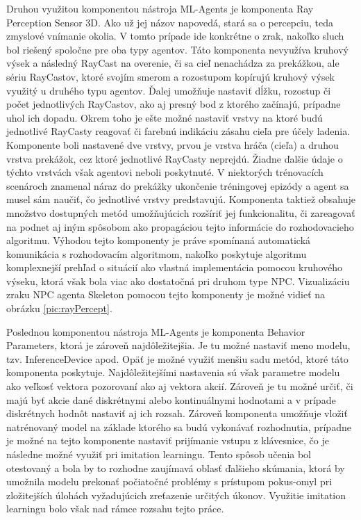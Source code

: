\documentclass[slovak, master]{diploma}
\begin{document}
Druhou využitou komponentou nástroja ML-Agents je komponenta Ray Perception Sensor 3D. Ako už jej názov napovedá, stará sa o percepciu, teda zmyslové vnímanie okolia. V tomto prípade ide konkrétne o zrak, nakoľko sluch bol riešený spoločne pre oba typy agentov. Táto komponenta nevyužíva kruhový výsek a následný RayCast na overenie, či sa cieľ nenachádza za prekážkou, ale sériu RayCastov, ktoré svojím smerom a rozostupom kopírujú kruhový výsek využitý u druhého typu agentov. Ďalej umožňuje nastaviť dĺžku, rozostup či počet jednotlivých RayCastov, ako aj presný bod z ktorého začínajú, prípadne uhol ich dopadu. Okrem toho je ešte možné nastaviť vrstvy na ktoré budú jednotlivé RayCasty reagovať či farebnú indikáciu zásahu cieľa pre účely ladenia. Komponente boli nastavené dve vrstvy, prvou je vrstva hráča (cieľa) a druhou vrstva prekážok, cez ktoré jednotlivé RayCasty neprejdú. Žiadne ďalšie údaje o týchto vrstvách však agentovi neboli poskytnuté. V niektorých trénovacích scenároch znamenal náraz do prekážky ukončenie tréningovej epizódy a agent sa musel sám naučiť, čo jednotlivé vrstvy predstavujú. 
Komponenta taktiež obsahuje množstvo dostupných metód umožňujúcich rozšíriť jej funkcionalitu, či zareagovať na podnet aj iným spôsobom ako propagáciou tejto informácie do rozhodovacieho algoritmu. Výhodou tejto komponenty je práve spomínaná automatická komunikácia s rozhodovacím algoritmom, nakoľko poskytuje algoritmu komplexnejší prehľad o situácií ako vlastná implementácia pomocou kruhového výseku, ktorá však bola viac ako dostatočná pri druhom type NPC. Vizualizáciu zraku NPC agenta Skeleton pomocou tejto komponenty je možné vidieť na obrázku \ref{pic:rayPercept}. 

Poslednou komponentou nástroja ML-Agents je komponenta Behavior Parameters, ktorá je zároveň najdôležitejšia. Je tu možné nastaviť meno modelu, tzv. InferenceDevice apod. Opäť je možné využiť menšiu sadu metód, ktoré táto komponenta poskytuje. Najdôležitejšími nastavenia sú však parametre modelu ako veľkosť vektora pozorovaní ako aj vektora akcií. Zároveň je tu možné určiť, či majú byť akcie dané diskrétnymi alebo kontinuálnymi hodnotami a v prípade diskrétnych hodnôt nastaviť aj ich rozsah. Zároveň komponenta umožňuje vložiť natrénovaný model na základe ktorého sa budú vykonávať rozhodnutia, prípadne je možné na tejto komponente nastaviť prijímanie vstupu z klávesnice, čo je následne možné využiť pri imitation learningu. Tento spôsob učenia bol otestovaný a bola by to rozhodne zaujímavá oblasť ďalšieho skúmania, ktorá by umožnila modelu prekonať počiatočné problémy s prístupom pokus-omyl pri zložitejších úlohách vyžadujúcich zreťazenie určitých úkonov. Využitie imitation learningu bolo však nad rámce rozsahu tejto práce.
\end{document}
